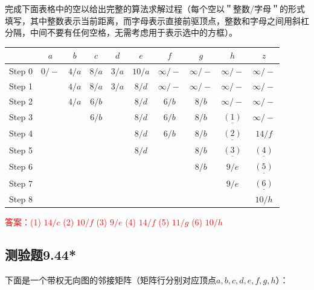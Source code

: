 \documentclass[UTF8, heading=true]{ctexart}
\begin{document}
完成下面表格中的空以给出完整的算法求解过程（每个空以＂整数/字母＂的形式填写，其中整数表示当前距离，而字母表示直接前驱顶点，整数和字母之间用斜杠分隔，中间不要有任何空格，无需考虑用于表示选中的方框）。

\begin{table}[H]
  \renewcommand{\arraystretch}{1.5}
  \centering
\begin{tabular}{c|c|c|c|c|c|c|c|c|c}
  \hline  & $a$ & $b$ & $c$ & $d$ & $e$ & $f$ & $g$ & $h$ & $z$ \\
  \hline Step  0 & $\boxed{0}/ -$ & $4/a$ & $8/a$ & $3 / a$ & $10 / a$ & $\infty /-$ & $\infty / -$ & $\infty /-$ & $\infty /-$ \\
  \hline Step  1 & & $4 / a$ & $8 / a$ & $\boxed{3} / a$ & $8 / d$ & $\infty /-$ & $\infty /-$ & $\infty /-$ & $\infty /-$ \\
  \hline Step  2 & & $\boxed{4}/a$ &$6/b$ & & $8 / d$ &$6/b$ & $8 / b$ & $\infty / -$ & $\infty / -$ \\
  \hline Step  3 & & & $\boxed{6}/b$ & & $8 / d$ & $6 / b$ & $8 / b$ & $\underline{(1)}$ & $\infty /-$ \\
  \hline Step  4 & & & & & $8 / d$ & $6 / b$ & $8 / b$ & $\underline{(2)}$ & $14 / f$ \\
  \hline Step  5 & & & & & $\boxed{8} / d$ & & $8 / b$ & $\underline{(3)}$ & $\underline{(4)}$ \\
  \hline Step  6 & & & & & & & $\boxed{8} / b$ & $9 / e$ & $\underline{(5)}$ \\
  \hline Step  7 & & & & & & & & $\boxed{9} / e$ & $\underline{(6)}$ \\
  \hline Step  8 & & & & & & & & & $\boxed{10} / h$ \\
  \hline
  \end{tabular}
\end{table}

\textcolor{red}{答案：(1) $14 / c$
(2) $10 / {f}$
(3) $9/e$
(4) $14 / {f}$
(5) $11 / {g}$
(6) $10 / {h}$}

\subsection{测验题9.44*}

下面是一个带权无向图的邻接矩阵（矩阵行分别对应顶点$a,b,c,d,e,f,g,h$）：
\end{document}
